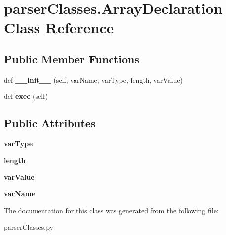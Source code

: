 \hypertarget{classparser_classes_1_1_array_declaration}{}\section{parser\+Classes.\+Array\+Declaration Class Reference}
\label{classparser_classes_1_1_array_declaration}
\subsection*{Public Member Functions}
\begin{DoxyCompactItemize}
\item 
\mbox{\label{classparser_classes_1_1_array_declaration_aa6752b68bcd3723ff304bf4cf5b24596}} 
def {\bfseries \+\_\+\+\_\+init\+\_\+\+\_\+} (self, var\+Name, var\+Type, length, var\+Value)
\item 
\mbox{\label{classparser_classes_1_1_array_declaration_a73740b52f27f696a085be661cffaeabb}} 
def {\bfseries exec} (self)
\end{DoxyCompactItemize}
\subsection*{Public Attributes}
\begin{DoxyCompactItemize}
\item 
\mbox{\label{classparser_classes_1_1_array_declaration_a17622e66df41a95f9b359700b7f8fbda}} 
{\bfseries var\+Type}
\item 
\mbox{\label{classparser_classes_1_1_array_declaration_a0c2efeb82bc5919dac3811d37ad4d8c9}} 
{\bfseries length}
\item 
\mbox{\label{classparser_classes_1_1_array_declaration_af4dc5a6cf288bce865fd7f198a3b3f71}} 
{\bfseries var\+Value}
\item 
\mbox{\label{classparser_classes_1_1_array_declaration_a4070f5daf43664847cb46a8d4cafdf56}} 
{\bfseries var\+Name}
\end{DoxyCompactItemize}


The documentation for this class was generated from the following file\+:\begin{DoxyCompactItemize}
\item 
parser\+Classes.\+py\end{DoxyCompactItemize}
